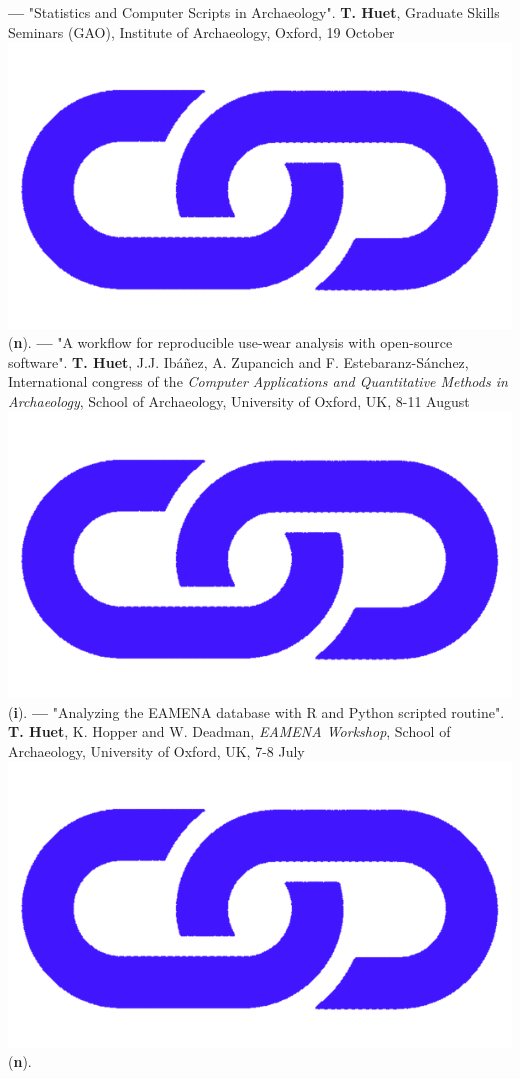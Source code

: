 \documentclass{article}
\begin{document}
\textbf{--- }"Statistics and Computer Scripts in Archaeology". \textbf{T. Huet}, Graduate Skills Seminars (GAO), Institute of Archaeology, Oxford, 19 October \href{http://shinyserver.cfs.unipi.it:3838/teach/stats/gao/_site/#/title-slide}{\includegraphics[scale=0.02]{link_darkblue.png}} (\textbf{n}).
\smallbreak
\textbf{--- }"A workflow for reproducible use-wear analysis with open-source software". \textbf{T. Huet}, J.J. Ibáñez, A. Zupancich and F. Estebaranz-Sánchez, International congress of the \textit{Computer Applications and Quantitative Methods in Archaeology}, School of Archaeology, University of Oxford, UK, 8-11 August \href{https://zoometh.github.io/reveal.js/projects/caa_3dlithic}{\includegraphics[scale=0.02]{link_darkblue.png}} (\textbf{i}).
\smallbreak
\textbf{--- }"Analyzing the EAMENA database with R and Python scripted routine". \textbf{T. Huet}, K. Hopper and W. Deadman, \textit{EAMENA Workshop}, School of Archaeology, University of Oxford, UK, 7-8 July \href{https://eamena-project.github.io/reveal.js/projects/time.html}{\includegraphics[scale=0.02]{link_darkblue.png}} (\textbf{n}).
\end{document}
